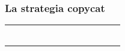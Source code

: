 \documentclass{beamer}
\begin{document}
\begin{frame}[t]
	
	\frametitle{La strategia copycat}
	
	\begin{tabular}{c c}
		
		
		&
		
		\\
		
		\begin{minipage}{0.48\textwidth}
			\begin{figure}[t]
				\Large
				\centering
				\def\svgwidth{0.6\textwidth}
				
			\end{figure}
		\end{minipage} &  \begin{minipage}{0.48\textwidth}
			\begin{figure}[t]
				\Large
				\centering
				\def\svgwidth{0.6\textwidth}
				
			\end{figure}
		\end{minipage} \\
		
		
		&
		
		
	\end{tabular}
	

	
\end{frame}
\end{document}
